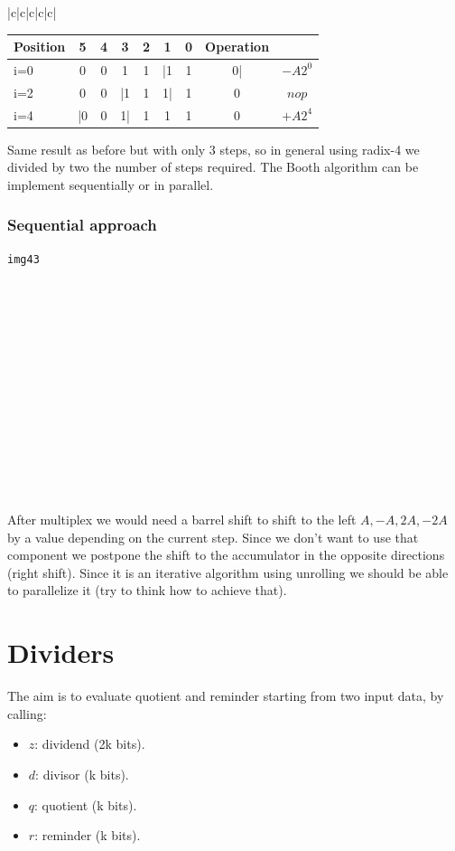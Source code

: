 \begin{center}
\begin{tabular}{|c|c|c|c|c|}
\begin{center}
\begin{tabular}{|l|c|c|c|c|c|c|c|c|}
  \hline
  Position&   5&  4&  3&  2&  1&  0&   Operation\\
  \hline
  i=0&    0&  0&  1&  1&  |1& 1&  0|&   $-A2^0$\\
  i=2&    0&  0&  |1& 1&  1|& 1&  0&    $nop$\\
  i=4&    |0&  0& 1|& 1&  1&  1&  0&    $+ A 2^4$\\
  \hline
\end{tabular}
\end{center}
Same result as before but with only 3 steps, so in general using radix-4 we divided by two the number of steps required.
The Booth algorithm can be implement sequentially or in parallel.

\subsection{Sequential approach}

\begin{verbatim}
img43














\end{verbatim}

After multiplex we would need a barrel shift to shift to the left $A, -A, 2A, -2A$ by a value depending on the current step. Since we don't want to use that component we postpone the shift to the accumulator in the opposite directions (right shift). Since it is an iterative algorithm using unrolling we should be able to parallelize it (try to think how to achieve that).

\chapter{Dividers}
The aim is to evaluate quotient and reminder starting from two input data, by calling:
\begin{itemize}
  \item $z$: dividend (2k bits).
  \item $d$: divisor  (k bits).
  \item $q$: quotient (k bits).
  \item $r$: reminder  (k bits). %
\end{itemize}


\end{tabular}
\end{center}
